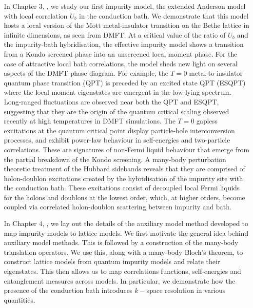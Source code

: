 In Chapter 3, \hyperref[sec:ESIAM]{\it \chapC}, we study our first impurity model, the extended Anderson model with local correlation \(U_b\) in the conduction bath. We demonstrate that this model hosts a local version of the Mott metal-insulator transition on the Bethe lattice in infinite dimensions, as seen from DMFT. At a critical value of the ratio of \(U_b\) and the impurity-bath hybridisation, the effective impurity model shows a transition from a Kondo screened phase into an unscreened local moment phase. For the case of attractive local bath correlations, the model sheds new light on several aspects of the DMFT phase diagram. For example, the \(T=0\) metal-to-insulator quantum phase transition (QPT) is preceded by an excited state QPT (ESQPT) where the local moment eigenstates are emergent in the low-lying spectrum. Long-ranged fluctuations are observed near both the QPT and ESQPT, suggesting that they are the origin of the quantum critical scaling observed recently at high temperatures in DMFT simulations. The \(T=0\) gapless excitations at the quantum critical point display particle-hole interconversion processes, and exhibit power-law behaviour in self-energies and two-particle correlations. These are signatures of non-Fermi liquid behaviour that emerge from the partial breakdown of the Kondo screening. A many-body perturbation theoretic treatment of the Hubbard sidebands reveals that they are comprised of holon-doublon excitations created by the hybridisation of the impurity site with the conduction bath. These excitations consist of decoupled local Fermi liquids for the holons and doublons at the lowest order, which, at higher orders, become coupled via correlated holon-doublon scattering between impurity and bath.

In Chapter 4, \hyperref[sec:tileForm]{\it \chapD}, we lay out the details of the auxiliary model method developed to map impurity models to lattice models. We first motivate the general idea behind auxiliary model methods. This is followed by a construction of the many-body translation operators. We use this, along with a many-body Bloch's theorem, to construct lattice models from quantum impurity models and relate their eigenstates. This then allows us to map correlations functions, self-energies and entanglement measures across models. In particular, we demonstrate how the presence of the conduction bath introduces $k-$space resolution in various quantities.

